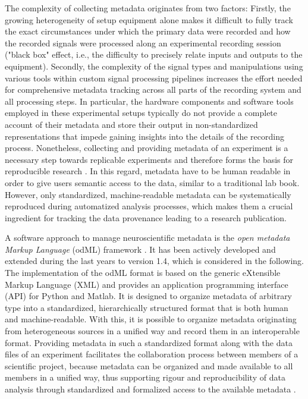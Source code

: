 {The complexity of collecting metadata originates from two factors: Firstly, the growing heterogeneity of setup equipment alone makes it difficult to fully track the exact circumstances under which the primary data were recorded and how the recorded signals were processed along an experimental recording session ("black box" effect, i.e., the difficulty to precisely relate inputs and outputs to the equipment). Secondly, the complexity of the signal types and manipulations using various tools within custom signal processing pipelines increases the effort needed for comprehensive metadata tracking across all parts of the recording system and all processing steps. In particular, the hardware components and software tools employed in these experimental setups typically do not provide a complete account of their metadata and store their output in non-standardized representations that impede gaining insights into the details of the recording process. Nonetheless, collecting and providing metadata of an experiment is a necessary step towards replicable experiments and therefore forms the basis for reproducible research \citep{Tebaykin_2017}. In this regard, metadata have to be human readable in order to give users semantic access to the data, similar to a traditional lab book. However, only standardized, machine-readable metadata can be systematically reproduced during automatized analysis processes, which makes them a crucial ingredient for tracking the data provenance leading to a research publication.

A software approach to manage neuroscientific metadata is the \textit{open metadata Markup Language} (odML) framework \citep{Grewe_2011}. It has been actively developed and extended during the last years to version 1.4, which is considered in the following. The implementation of the odML format is based on the generic eXtensible Markup Language (XML) and provides an application programming interface (API) for Python and Matlab. It is designed to organize metadata of arbitrary type into a standardized, hierarchically structured format that is both human and machine-readable. With this, it is possible to organize metadata originating from heterogeneous sources in a unified way and record them in an interoperable format. Providing metadata in such a standardized format along with the data files of an experiment facilitates the collaboration process between members of a scientific project, because metadata can be organized and made available to all members in a unified way, thus supporting rigour and reproducibility of data analysis through standardized and formalized access to the available metadata \citep{Zehl_2016}.

}
